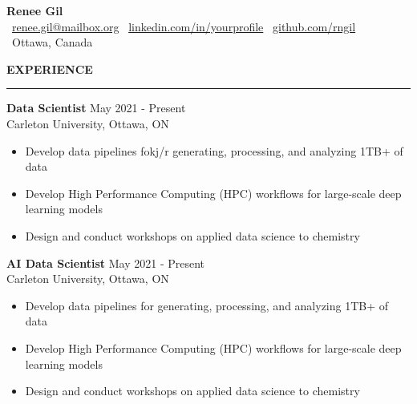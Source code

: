 \documentclass[11pt]{article}
\begin{document}
\pagestyle{empty}

\begin{center}
    \textbf{\Huge Renee Gil} \\[8pt]
    {\small
    \faEnvelope\ \href{mailto:renee.gil@mailbox.org}{renee.gil@mailbox.org} \hspace{0.2in}
    \faLinkedin\ \href{https://linkedin.com/in/yourprofile}{linkedin.com/in/yourprofile} \hspace{0.2in}
    \faGithub\ \href{https://github.com/rngil}{github.com/rngil} \\[4pt]
    \faMapMarker*\ Ottawa, Canada
    }
\end{center}

{\color{headinggray}\textbf{\large EXPERIENCE}}\\[-10pt]
\noindent\textcolor{accentblue}{\rule{\textwidth}{1.5pt}}
\vspace*{-0.15in}

\textbf{Data Scientist} \hfill {\color{accentgray} May 2021 - Present}\\
{\color{accentgray} Carleton University, Ottawa, ON}\\[4pt]
\begin{itemize}[itemsep=0.1pt, topsep=0pt]
    \item Develop data pipelines fokj/r generating, processing, and analyzing 1TB+ of data
    \item Develop High Performance Computing (HPC) workflows for large-scale deep learning models
    \item Design and conduct workshops on applied data science to chemistry
\end{itemize}
\vspace*{0.15in}

\textbf{AI Data Scientist} \hfill {\color{accentgray} May 2021 - Present}\\
{\color{accentgray} Carleton University, Ottawa, ON}\\[4pt]
\begin{itemize}[itemsep=0.1pt, topsep=0pt]
    \item Develop data pipelines for generating, processing, and analyzing 1TB+ of data
    \item Develop High Performance Computing (HPC) workflows for large-scale deep learning models
    \item Design and conduct workshops on applied data science to chemistry
\end{itemize}
\vspace*{0.15in}
\end{document}
